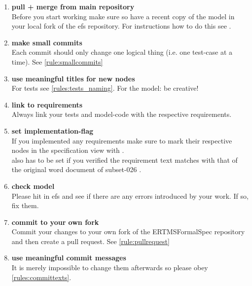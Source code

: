 \documentclass[draft]{efsguide}
\begin{document}
\begin{appendices}
\begin{enumerate}
\item \textbf{pull + merge from main repository}\\
Before you start working make sure so have a recent copy of the model in your local fork of the \gls{efs} repository. For instructions how to do this see \cite{gitworkflow}. 
\item \textbf{make small commits}\\
Each commit should only change one logical thing (i.e. one test-case at a time). See \ref{rule:smallcommits} 
\item \textbf{use meaningful titles for new nodes}\\
For tests see \ref{rules:tests_naming}. For the model: be creative! 
\item \textbf{link to requirements}\\
Always link your tests and model-code with the respective requirements. 
\item \textbf{set implementation-flag}\\
If you implemented any requirements make sure to mark their respective nodes in the specification view with .\\  also has to be set if you verified the requirement text matches with that of the original word document of subset-026 \cite{subset26}. 
\item \textbf{check model}\\
Please hit  in \gls{efs} and see if there are any errors introduced by your work. If so, fix them. 
\item \textbf{commit to your own fork}\\
Commit your changes to your own fork of the ERTMSFormalSpec repository and then create a pull request. See \ref{rule:pullrequest} 
\item \textbf{use meaningful commit messages}\\
It is merely impossible to change them afterwards so please obey \ref{rules:committexts}. 
\end{enumerate}

\end{appendices}



{}
\printglossary[style=listdotted]
\newpage

{}


\end{document}
